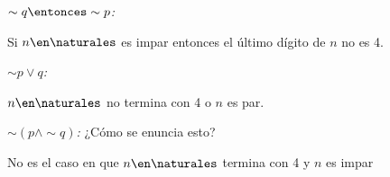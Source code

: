 \begin{enumerate}[label=\roman*)]
\begin{itemize}
                \textit{$\sim q \entonces \sim p$:}
                \begin{center}
                  Si $n \en \naturales$ es impar entonces el último dígito de $n$ no es 4.
                \end{center}

                \textit{$\sim p \lor q$:}
                \begin{center}
                  $n \en \naturales$ no termina con 4 o $n$ es par.
                \end{center}

                \textit{$\sim (p \land \sim q)$:}
                ¿Cómo se enuncia esto?
                \begin{center}
                  No es el caso en que $n \en \naturales$ termina con 4 y $n$ es impar
                \end{center}
        \end{itemize}
\end{enumerate}

\begin{aportes}
  \item {}
  \item {}
  \item {}
\end{aportes}
